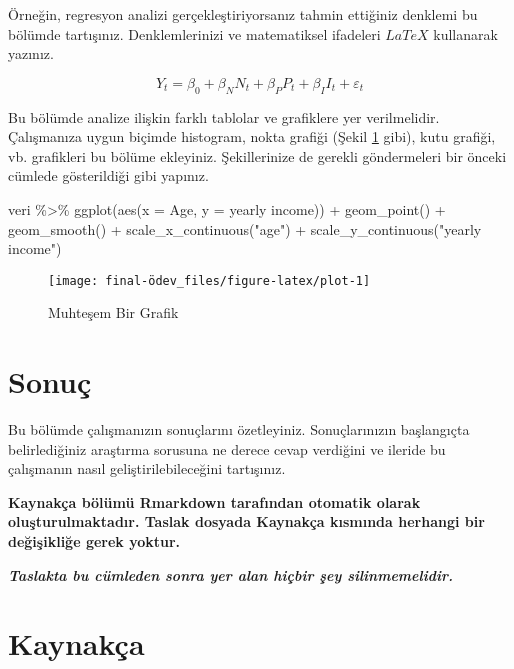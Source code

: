 \documentclass[
  12pt,
]{article}
\newenvironment{Shaded}{\begin{snugshade}}{\end{snugshade}}
\newcommand{\AttributeTok}[1]{\textcolor[rgb]{0.77,0.63,0.00}{#1}}
\newcommand{\FunctionTok}[1]{\textcolor[rgb]{0.00,0.00,0.00}{#1}}
\newcommand{\NormalTok}[1]{#1}
\newcommand{\SpecialCharTok}[1]{\textcolor[rgb]{0.00,0.00,0.00}{#1}}
\newcommand{\StringTok}[1]{\textcolor[rgb]{0.31,0.60,0.02}{#1}}
\newlength{\cslhangindent}
\newlength{\cslentryspacingunit} %
\newenvironment{CSLReferences}[2] %
 {%
  \setlength{\parindent}{0pt}
  \ifodd #1
  \let\oldpar\par
  \def\par{\hangindent=\cslhangindent\oldpar}
  \fi
  \setlength{\parskip}{#2\cslentryspacingunit}
 }%
 {}
\begin{document}
Örneğin, regresyon analizi gerçekleştiriyorsanız tahmin ettiğiniz denklemi bu bölümde tartışınız. Denklemlerinizi ve matematiksel ifadeleri \(LaTeX\) kullanarak yazınız.

\[
Y_t = \beta_0 + \beta_N N_t + \beta_P P_t + \beta_I I_t + \varepsilon_t
\]

Bu bölümde analize ilişkin farklı tablolar ve grafiklere yer verilmelidir. Çalışmanıza uygun biçimde histogram, nokta grafiği (Şekil \ref{fig:plot} gibi), kutu grafiği, vb. grafikleri bu bölüme ekleyiniz. Şekillerinize de gerekli göndermeleri bir önceki cümlede gösterildiği gibi yapınız.

\begin{Shaded}
\begin{Highlighting}[]
\NormalTok{veri }\SpecialCharTok{\%\textgreater{}\%} 
\FunctionTok{ggplot}\NormalTok{(}\FunctionTok{aes}\NormalTok{(}\AttributeTok{x =}\NormalTok{ Age, }\AttributeTok{y =} \StringTok{\textasciigrave{}}\AttributeTok{yearly income}\StringTok{\textasciigrave{}}\NormalTok{)) }\SpecialCharTok{+}
  \FunctionTok{geom\_point}\NormalTok{() }\SpecialCharTok{+}
  \FunctionTok{geom\_smooth}\NormalTok{() }\SpecialCharTok{+}
  \FunctionTok{scale\_x\_continuous}\NormalTok{(}\StringTok{"age"}\NormalTok{) }\SpecialCharTok{+} 
  \FunctionTok{scale\_y\_continuous}\NormalTok{(}\StringTok{"yearly income"}\NormalTok{)}
\end{Highlighting}
\end{Shaded}

\begin{figure}

{\centering \texttt{[image: final-ödev\_files/figure-latex/plot-1]} 

}

\caption{Muhteşem Bir Grafik}\label{fig:plot}
\end{figure}

\hypertarget{sonuuxe7}{%
\section{Sonuç}\label{sonuuxe7}}

Bu bölümde çalışmanızın sonuçlarını özetleyiniz. Sonuçlarınızın başlangıçta belirlediğiniz araştırma sorusuna ne derece cevap verdiğini ve ileride bu çalışmanın nasıl geliştirilebileceğini tartışınız.

\textbf{Kaynakça bölümü Rmarkdown tarafından otomatik olarak oluşturulmaktadır. Taslak dosyada Kaynakça kısmında herhangi bir değişikliğe gerek yoktur.}

\textbf{\emph{Taslakta bu cümleden sonra yer alan hiçbir şey silinmemelidir.}}

\newpage

\hypertarget{references}{%
\section{Kaynakça}\label{references}}

\hypertarget{refs}{}
\begin{CSLReferences}{0}{0}
\end{CSLReferences}
\end{document}
